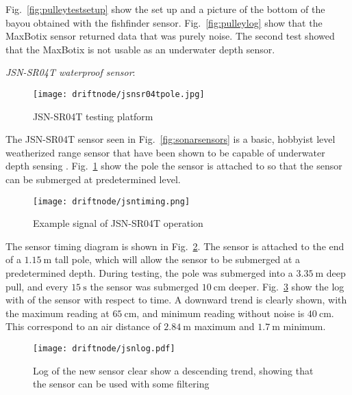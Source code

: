 Fig.~\ref{fig:pulleytestsetup} show the set up and a picture of the bottom of the bayou obtained with the fishfinder sensor.
Fig.~\ref{fig:pulleylog} show that the MaxBotix sensor returned data that was purely noise.
The second test showed that the MaxBotix is not usable as an underwater depth sensor.

\noindent  \emph{JSN-SR04T waterproof sensor}:

\begin{figure}[h]
	\begin{center}
	\texttt{[image: driftnode/jsnsr04tpole.jpg]}
	\caption[JSN-SR04T]{
		JSN-SR04T testing platform
	} \label{fig:jsnsr04t}
	\end{center}
	\vspace{-1em}
\end{figure}
The JSN-SR04T sensor seen in Fig.~\ref{fig:sonarsensors} is a basic, hobbyist level weatherized range sensor that have been shown to be capable of underwater depth sensing \cite{bakarsonar}. Fig.~\ref{fig:jsnsr04t} show the pole the sensor is attached to so that the sensor can be submerged at predetermined level.
\begin{figure}[h]
	\begin{center}
	\texttt{[image: driftnode/jsntiming.png]}
	\caption[JSN-SR04T Timing]{
		Example signal of JSN-SR04T operation
	} \label{fig:jsntiming}
	\end{center}
	\vspace{-1em}
\end{figure}
The sensor timing diagram is shown in Fig.~\ref{fig:jsntiming}.
The sensor is attached to the end of a $\SI{1.15}{\metre}$ tall pole, which will allow the sensor to be submerged at a predetermined depth.
During testing, the pole was submerged into a $\SI{3.35}{\metre}$ deep pull, and every $\SI{15}{\second}$ the sensor was submerged $\SI{10}{\centi\metre}$ deeper.
Fig.~\ref{fig:jsnlog} show the log with of the sensor with respect to time.
A downward trend is clearly shown, with the maximum reading at $\SI{65}{\centi\metre}$, and minimum reading without noise is $\SI{40}{\centi\metre}$.
This correspond to an air distance of $\SI{2.84}{\metre}$ maximum and $\SI{1.7}{\metre}$ minimum.

\begin{figure}[h]
	\begin{center}
	\texttt{[image: driftnode/jsnlog.pdf]}
	\caption[JSN-SR04T sensor log]{
		Log of the new sensor clear show a descending trend, showing that the sensor can be used with some filtering
	} \label{fig:jsnlog}
	\end{center}
	\vspace{-1em}
\end{figure}
